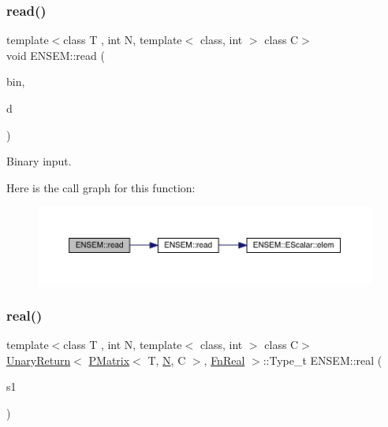 \subsubsection{\texorpdfstring{read()}{read()}}
{\footnotesize\ttfamily template$<$class T , int N, template$<$ class, int $>$ class C$>$ \\
void E\+N\+S\+E\+M\+::read (\begin{DoxyParamCaption}\item[{\mbox{\hyperlink{classADATIO_1_1BinaryReader}{A\+D\+A\+T\+I\+O\+::\+Binary\+Reader}} \&}]{bin,  }\item[{\mbox{\hyperlink{classENSEM_1_1PMatrix}{P\+Matrix}}$<$ T, \mbox{\hyperlink{operator__name__util_8cc_a7722c8ecbb62d99aee7ce68b1752f337}{N}}, C $>$ \&}]{d }\end{DoxyParamCaption})\hspace{0.3cm}{\ttfamily [inline]}}



Binary input. 

Here is the call graph for this function\+:\nopagebreak
\begin{figure}[H]
\begin{center}
\leavevmode
\includegraphics[width=350pt]{df/d0a/group__primmatrix_ga95daf5fb6c2f089f11774d123f8795d5_cgraph}
\end{center}
\end{figure}
\mbox{\label{group__primmatrix_ga5d6f44c46b47f8dc972b40a518058e0e}} 
\subsubsection{\texorpdfstring{real()}{real()}}
{\footnotesize\ttfamily template$<$class T , int N, template$<$ class, int $>$ class C$>$ \\
\mbox{\hyperlink{structENSEM_1_1UnaryReturn}{Unary\+Return}}$<$ \mbox{\hyperlink{classENSEM_1_1PMatrix}{P\+Matrix}}$<$ T, \mbox{\hyperlink{operator__name__util_8cc_a7722c8ecbb62d99aee7ce68b1752f337}{N}}, C $>$, \mbox{\hyperlink{structENSEM_1_1FnReal}{Fn\+Real}} $>$\+::Type\+\_\+t E\+N\+S\+E\+M\+::real (\begin{DoxyParamCaption}\item[{const \mbox{\hyperlink{classENSEM_1_1PMatrix}{P\+Matrix}}$<$ T, \mbox{\hyperlink{operator__name__util_8cc_a7722c8ecbb62d99aee7ce68b1752f337}{N}}, C $>$ \&}]{s1 }\end{DoxyParamCaption})\hspace{0.3cm}{\ttfamily [inline]}}

